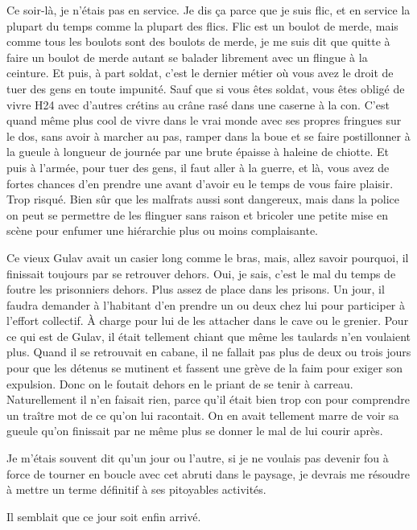 Ce soir-là, je n’étais pas en service. Je dis ça parce que je suis flic, et en service la plupart du temps comme la plupart des flics. \label{rat:3}Flic est un boulot de merde, mais comme tous les boulots sont des boulots de merde, je me suis dit que quitte à faire un boulot de merde autant se balader librement avec un flingue à la ceinture. Et puis, à part soldat, c’est le dernier métier où vous avez le droit de tuer des gens en toute impunité. Sauf que si vous êtes soldat, vous êtes obligé de vivre H24 avec d’autres crétins au crâne rasé dans une caserne à la con. C’est quand même plus cool de vivre dans le vrai monde avec ses propres fringues sur le dos, sans avoir à marcher au pas, ramper dans la boue et se faire postillonner à la gueule à longueur de journée par une brute épaisse à haleine de chiotte. Et puis à l’armée, pour tuer des gens, il faut aller à la guerre, et là, vous avez de fortes chances d’en prendre une avant d’avoir eu le temps de vous faire plaisir. Trop risqué. Bien sûr que les malfrats aussi sont dangereux, mais dans la police on peut se permettre de les flinguer sans raison et bricoler une petite mise en scène pour enfumer une hiérarchie plus ou moins complaisante.

%
%
Ce vieux Gulav avait un casier long comme le bras, mais, allez savoir pourquoi, il finissait toujours par se retrouver dehors. Oui, je sais, c’est le mal du temps de foutre les prisonniers dehors. Plus assez de place dans les prisons. Un jour, il faudra demander à l’habitant d’en prendre un ou deux chez lui pour participer à l’effort collectif. À charge pour lui de les attacher dans le cave ou le grenier. Pour ce qui est de Gulav, il était tellement chiant que même les taulards n’en voulaient plus. Quand il se retrouvait en cabane, il ne fallait pas plus de deux ou trois jours pour que les détenus se mutinent et fassent une grève de la faim pour exiger son expulsion. Donc on le foutait dehors en le priant de se tenir à carreau. Naturellement il n’en faisait rien, parce qu’il était bien trop con pour comprendre un traître mot de ce qu’on lui racontait. On en avait tellement marre de voir sa gueule qu’on finissait par ne même plus se donner le mal de lui courir après.

Je m’étais souvent dit qu’un jour ou l’autre, si je ne voulais pas devenir fou à force de tourner en boucle avec cet abruti dans le paysage, je devrais me résoudre à mettre un terme définitif à ses pitoyables activités.

Il semblait que ce jour soit enfin arrivé.

